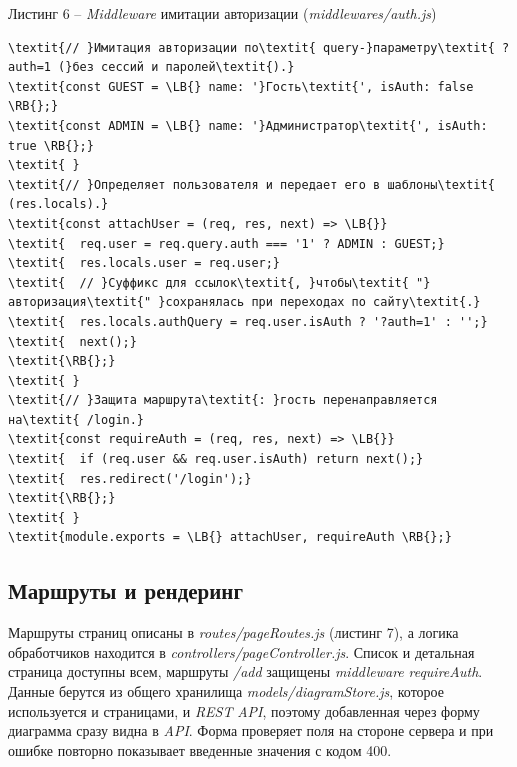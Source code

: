 \documentclass[14pt,a4paper]{extarticle}
\newcommand{\LB}{\char123}
\newcommand{\RB}{\char125}
\begin{document}
\noindent\vspace{18pt}\par\nopagebreak\noindent Листинг 6 – \textit{Middleware} имитации авторизации (\textit{middlewares/auth.js})\par\nopagebreak
\begin{Verbatim}[commandchars=\\\{\},fontsize=\small,baselinestretch=1]
\textit{// }Имитация авторизации по\textit{ query-}параметру\textit{ ?auth=1 (}без сессий и паролей\textit{).}
\textit{const GUEST = \LB{} name: '}Гость\textit{', isAuth: false \RB{};}
\textit{const ADMIN = \LB{} name: '}Администратор\textit{', isAuth: true \RB{};}
\textit{ }
\textit{// }Определяет пользователя и передает его в шаблоны\textit{ (res.locals).}
\textit{const attachUser = (req, res, next) => \LB{}}
\textit{  req.user = req.query.auth === '1' ? ADMIN : GUEST;}
\textit{  res.locals.user = req.user;}
\textit{  // }Суффикс для ссылок\textit{, }чтобы\textit{ "}авторизация\textit{" }сохранялась при переходах по сайту\textit{.}
\textit{  res.locals.authQuery = req.user.isAuth ? '?auth=1' : '';}
\textit{  next();}
\textit{\RB{};}
\textit{ }
\textit{// }Защита маршрута\textit{: }гость перенаправляется на\textit{ /login.}
\textit{const requireAuth = (req, res, next) => \LB{}}
\textit{  if (req.user && req.user.isAuth) return next();}
\textit{  res.redirect('/login');}
\textit{\RB{};}
\textit{ }
\textit{module.exports = \LB{} attachUser, requireAuth \RB{};}
\end{Verbatim}
\vspace{18pt}

\subsection{Маршруты и рендеринг}

Маршруты страниц описаны в \textit{routes/pageRoutes.js} (листинг 7), а логика обработчиков находится в \textit{controllers/pageController.js}. Список и детальная страница доступны всем, маршруты \textit{/add} защищены \textit{middleware} \textit{requireAuth}. Данные берутся из общего хранилища \textit{models/diagramStore.js}, которое используется и страницами, и \textit{REST} \textit{API}, поэтому добавленная через форму диаграмма сразу видна в \textit{API}. Форма проверяет поля на стороне сервера и при ошибке повторно показывает введенные значения с кодом 400.
\end{document}
